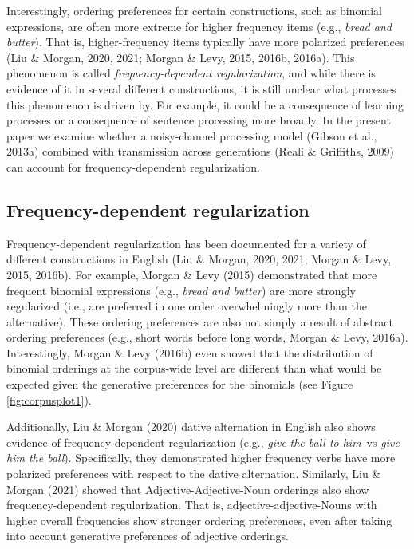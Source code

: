 \documentclass[10pt, letterpaper]{article}
\begin{document}
Interestingly, ordering preferences for certain constructions, such as
binomial expressions, are often more extreme for higher frequency items
(e.g., \emph{bread and butter}). That is, higher-frequency items
typically have more polarized preferences (Liu \& Morgan, 2020, 2021;
Morgan \& Levy, 2015, 2016b, 2016a). This phenomenon is called
\emph{frequency-dependent regularization}, and while there is evidence
of it in several different constructions, it is still unclear what
processes this phenomenon is driven by. For example, it could be a
consequence of learning processes or a consequence of sentence
processing more broadly. In the present paper we examine whether a
noisy-channel processing model (Gibson et al., 2013a) combined with
transmission across generations (Reali \& Griffiths, 2009) can account
for frequency-dependent regularization.

\hypertarget{frequency-dependent-regularization}{%
\subsection{Frequency-dependent
regularization}\label{frequency-dependent-regularization}}

Frequency-dependent regularization has been documented for a variety of
different constructions in English (Liu \& Morgan, 2020, 2021; Morgan \&
Levy, 2015, 2016b). For example, Morgan \& Levy (2015) demonstrated that
more frequent binomial expressions (e.g., \emph{bread and butter}) are
more strongly regularized (i.e., are preferred in one order
overwhelmingly more than the alternative). These ordering preferences
are also not simply a result of abstract ordering preferences (e.g.,
short words before long words, Morgan \& Levy, 2016a). Interestingly,
Morgan \& Levy (2016b) even showed that the distribution of binomial
orderings at the corpus-wide level are different than what would be
expected given the generative preferences for the binomials (see Figure
\ref{fig:corpusplot1}).

Additionally, Liu \& Morgan (2020) dative alternation in English also
shows evidence of frequency-dependent regularization (e.g., \emph{give}
\emph{the ball to him}~vs \emph{give him the ball}). Specifically, they
demonstrated higher frequency verbs have more polarized preferences with
respect to the dative alternation. Similarly, Liu \& Morgan (2021)
showed that Adjective-Adjective-Noun orderings also show
frequency-dependent regularization. That is, adjective-adjective-Nouns
with higher overall frequencies show stronger ordering preferences, even
after taking into account generative preferences of adjective orderings.
\end{document}
